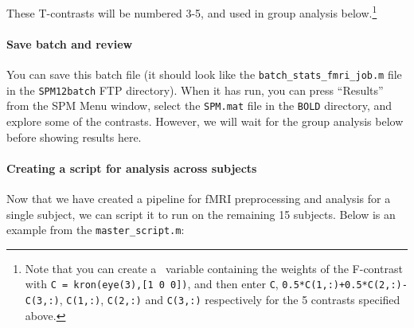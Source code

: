 These T-contrasts will be numbered 3-5, and used in group analysis below.\footnote{
Note that you can create a \matlab\ variable containing the weights of the F-contrast with \texttt{C = kron(eye(3),[1 0 0])}, and then enter \texttt{C}, \texttt{0.5*C(1,:)+0.5*C(2,:)-C(3,:)}, \texttt{C(1,:)}, \texttt{C(2,:)} and \texttt{C(3,:)} respectively for the 5 contrasts specified above.
}

\paragraph{Save batch and review}

You can save this batch file (it should look like the \texttt{batch\_stats\_fmri\_job.m} file in the \texttt{SPM12batch} FTP directory). When it has run, you can press ``Results'' from the SPM Menu window, select the \texttt{SPM.mat} file in the \texttt{BOLD} directory, and explore some of the contrasts. However, we will wait for the group analysis below before showing results here.

\paragraph{Creating a script for analysis across subjects}

Now that we have created a pipeline for fMRI preprocessing and analysis for a single subject, we can script it to run on the remaining 15 subjects. Below is an example from the \texttt{master\_script.m}:

